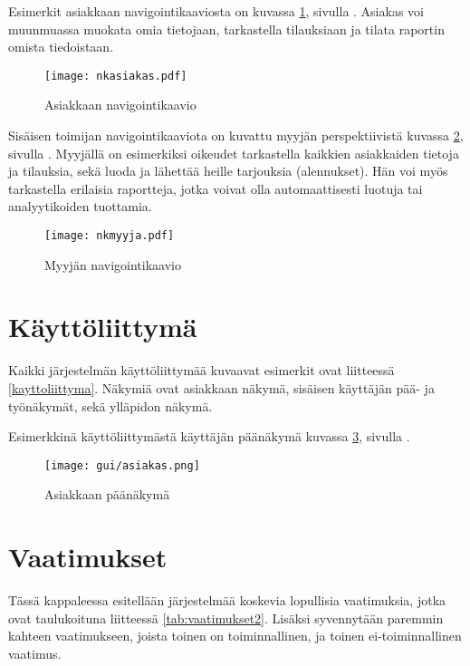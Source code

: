     Esimerkit asiakkaan navigointikaaviosta on kuvassa \ref{img:nkasiakas}, sivulla \pageref{img:nkasiakas}. Asiakas voi muunmuassa muokata omia tietojaan, tarkastella tilauksiaan ja tilata raportin omista tiedoistaan.

    \begin{figure}[h]
        \centering
        \texttt{[image: nkasiakas.pdf]}
        \caption{Asiakkaan navigointikaavio}
        \label{img:nkasiakas}
    \end{figure}
    
    Sisäisen toimijan navigointikaaviota on kuvattu myyjän perspektiivistä kuvassa \ref{img:nkmyyja}, sivulla \pageref{img:nkmyyja}. Myyjällä on esimerkiksi oikeudet tarkastella kaikkien asiakkaiden tietoja ja tilauksia, sekä luoda ja lähettää heille tarjouksia (alennukset).
    Hän voi myös tarkastella erilaisia raportteja, jotka voivat olla automaattisesti luotuja tai analyytikoiden tuottamia.
    
    \begin{figure}[h]
        \centering
        \texttt{[image: nkmyyja.pdf]}
        \caption{Myyjän navigointikaavio}
        \label{img:nkmyyja}
    \end{figure}

    \pagebreak

\section{Käyttöliittymä}  %
    
    Kaikki järjestelmän käyttöliittymää kuvaavat esimerkit ovat liitteessä \ref{kayttoliittyma}. Näkymiä ovat asiakkaan näkymä, sisäisen käyttäjän pää- ja työnäkymät, sekä ylläpidon näkymä.
    
    Esimerkkinä käyttöliittymästä käyttäjän päänäkymä kuvassa \ref{img:asiakasesimerkki}, sivulla \pageref{img:asiakasesimerkki}.

    \begin{figure}[h!]
        \centering
        \texttt{[image: gui/asiakas.png]}
        \caption{Asiakkaan päänäkymä}
        \label{img:asiakasesimerkki}
    \end{figure}

\section{Vaatimukset}       %

    Tässä kappaleessa esitellään järjestelmää koskevia lopullisia vaatimuksia, jotka ovat taulukoituna liitteessä \ref{tab:vaatimukset2}.
    Lisäksi syvennytään paremmin kahteen vaatimukseen, joista toinen on toiminnallinen, ja toinen ei-toiminnallinen
    vaatimus.

